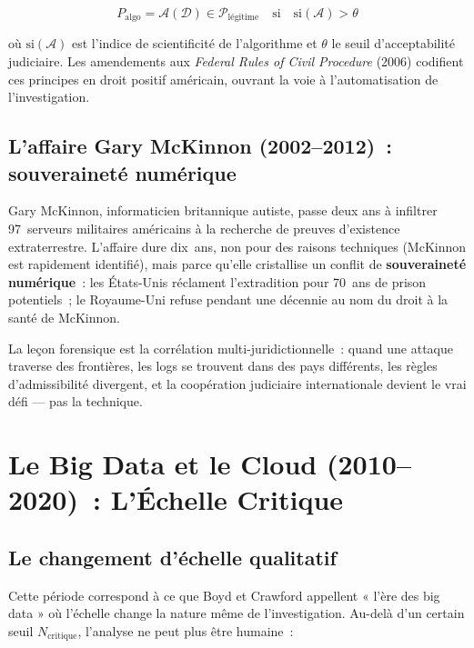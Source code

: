 \begin{equation}
P_{\text{algo}} = \mathcal{A}(\mathcal{D}) \in \mathcal{P}_{\text{légitime}}
\quad \text{si} \quad \mathrm{si}(\mathcal{A}) > \theta
\label{eq:preuve-algo}
\end{equation}

où $\mathrm{si}(\mathcal{A})$ est l'indice de scientificité de l'algorithme et
$\theta$ le seuil d'acceptabilité judiciaire. Les amendements aux
\textit{Federal Rules of Civil Procedure} (2006) codifient ces principes
en droit positif américain, ouvrant la voie à l'automatisation de l'investigation.

\subsection{L'affaire Gary McKinnon (2002--2012)~: souveraineté numérique}

Gary McKinnon, informaticien britannique autiste, passe deux ans à infiltrer
97~serveurs militaires américains à la recherche de preuves d'existence
extraterrestre. L'affaire dure dix~ans, non pour des raisons techniques (McKinnon
est rapidement identifié), mais parce qu'elle cristallise un conflit de
\textbf{souveraineté numérique}~: les États-Unis réclament l'extradition
pour 70~ans de prison potentiels~; le Royaume-Uni refuse pendant une décennie
au nom du droit à la santé de McKinnon.

\medskip

La leçon forensique est la corrélation multi-juridictionnelle~: quand une
attaque traverse des frontières, les logs se trouvent dans des pays différents,
les règles d'admissibilité divergent, et la coopération judiciaire internationale
devient le vrai défi --- pas la technique.

\section{Le Big Data et le Cloud (2010--2020)~: L'Échelle Critique}

\subsection{Le changement d'échelle qualitatif}

Cette période correspond à ce que Boyd et Crawford appellent « l'ère des
big data » où l'échelle change la nature même de l'investigation. Au-delà
d'un certain seuil $N_{\text{critique}}$, l'analyse ne peut plus être humaine~:

